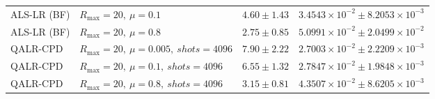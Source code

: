 \begin{table}[t]
\begin{tabular}{@{}llcc@{}}
ALS-LR (BF) & \(R_{\max}=20,\ \mu=0.1\) & \(4.60 \pm 1.43\) & \(3.4543{\times}10^{-2} \pm 8.2053{\times}10^{-3}\) \\
ALS-LR (BF) & \(R_{\max}=20,\ \mu=0.8\) & \(2.75 \pm 0.85\) & \(5.0991{\times}10^{-2} \pm 2.0499{\times}10^{-2}\) \\
QALR-CPD & \(R_{\max}=20,\ \mu=0.005,\ shots=4096\) & \(7.90 \pm 2.22\) & \(2.7003{\times}10^{-2} \pm 2.2209{\times}10^{-3}\) \\
QALR-CPD & \(R_{\max}=20,\ \mu=0.1,\ shots=4096\) & \(6.55 \pm 1.32\) & \(2.7847{\times}10^{-2} \pm 1.9848{\times}10^{-3}\) \\
QALR-CPD & \(R_{\max}=20,\ \mu=0.8,\ shots=4096\) & \(3.15 \pm 0.81\) & \(4.3507{\times}10^{-2} \pm 8.6205{\times}10^{-3}\) \\
\bottomrule
\end{tabular}
\end{table}